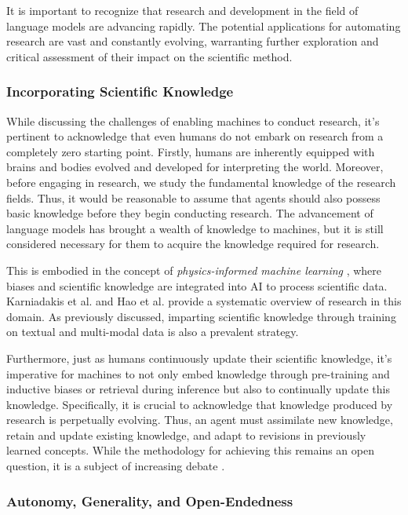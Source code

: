 \documentclass{article}
\begin{document}
It is important to recognize that research and development in the field of language models are advancing rapidly. The potential applications for automating research are vast and constantly evolving, warranting further exploration and critical assessment of their impact on the scientific method.

\subsubsection{Incorporating Scientific Knowledge}

While discussing the challenges of enabling machines to conduct research, it's pertinent to acknowledge that even humans do not embark on research from a completely zero starting point. Firstly, humans are inherently equipped with brains and bodies evolved and developed for interpreting the world. Moreover, before engaging in research, we study the fundamental knowledge of the research fields. Thus, it would be reasonable to assume that agents should also possess basic knowledge before they begin conducting research. The advancement of language models has brought a wealth of knowledge to machines, but it is still considered necessary for them to acquire the knowledge required for research.

This is embodied in the concept of \textit{physics-informed machine learning} \cite{karniadakis2021physics}, where biases and scientific knowledge are integrated into AI to process scientific data. Karniadakis et al. \cite{karniadakis2021physics} and Hao et al. \cite{hao2022physics} provide a systematic overview of research in this domain. As previously discussed, imparting scientific knowledge through training on textual and multi-modal data is also a prevalent strategy.

Furthermore, just as humans continuously update their scientific knowledge, it's imperative for machines to not only embed knowledge through pre-training and inductive biases or retrieval during inference but also to continually update this knowledge. Specifically, it is crucial to acknowledge that knowledge produced by research is perpetually evolving. Thus, an agent must assimilate new knowledge, retain and update existing knowledge, and adapt to revisions in previously learned concepts. While the methodology for achieving this remains an open question, it is a subject of increasing debate \cite{kitano2021nobel,zenil2023future}.

\subsubsection{Autonomy, Generality, and Open-Endedness}
\end{document}
